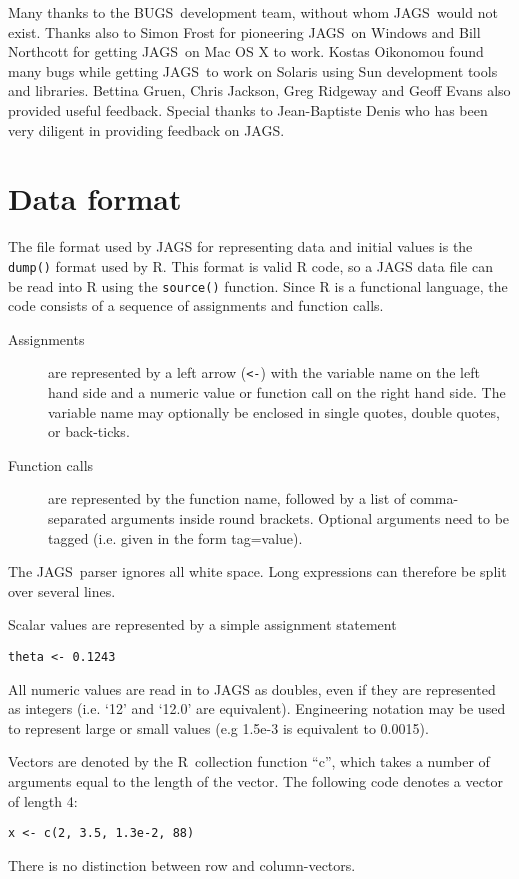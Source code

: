 \documentclass[11pt, a4paper, titlepage]{report}
\newcommand{\JAGS}{\textsf{JAGS}}
\newcommand{\BUGS}{\textsf{BUGS}}
\newcommand{\R}{\textsf{R}}
\begin{document}
Many thanks to the \BUGS\ development team, without whom \JAGS\ would
not exist.  Thanks also to Simon Frost for pioneering \JAGS\ on
Windows and Bill Northcott for getting \JAGS\ on Mac OS X to
work. Kostas Oikonomou found many bugs while getting \JAGS\ to work on
Solaris using Sun development tools and libraries.  Bettina Gruen,
Chris Jackson, Greg Ridgeway and Geoff Evans also provided useful
feedback.  Special thanks to Jean-Baptiste Denis who has been very
diligent in providing feedback on JAGS.

\appendix
\chapter{Data format}
\label{appendix:data}

The file format used by JAGS for representing data and initial values
is the \verb+dump()+ format used by R.  This format is valid R code,
so a JAGS data file can be read into R using the \verb+source()+ function.
Since R is a functional language, the code consists of a sequence
of assignments and function calls.
\begin{description}
\item[Assignments] are represented by a left arrow (\verb+<-+) with
  the variable name on the left hand side and a numeric value or
  function call on the right hand side. The variable name may
  optionally be enclosed in single quotes, double quotes, or back-ticks.
\item[Function calls] are represented by the function name, followed
  by a list of comma-separated arguments inside round brackets.
  Optional arguments need to be tagged (i.e. given in the form
  tag=value).
\end{description}
The \JAGS\ parser ignores all white space.  Long expressions can
therefore be split over several lines.

Scalar values are represented by a simple assignment statement 
\begin{verbatim}
theta <- 0.1243
\end{verbatim}
All numeric values are read in to JAGS as doubles, even if they are
represented as integers (i.e. `12' and `12.0' are
equivalent). Engineering notation may be used to represent large or
small values (e.g 1.5e-3 is equivalent to 0.0015).

Vectors are denoted by the \R\ collection function ``c'', which takes
a number of arguments equal to the length of the vector.  The
following code denotes a vector of length 4:
\begin{verbatim}
x <- c(2, 3.5, 1.3e-2, 88)
\end{verbatim}
There is no distinction between row and column-vectors. 
\end{document}

